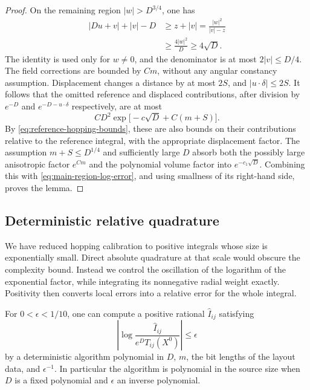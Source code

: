 \begin{proof}
On the remaining region $|w|>D^{3/4}$, one has
\begin{equation}
 \begin{split}
 |Du+v|+|v|-D
   &\ge z+|v|
    =\frac{|w|^2}{|v|-z}\\
   &\ge\frac{4|w|^2}{D}
    \ge4\sqrt D.
 \end{split}
 \label{eq:transverse-excess}
\end{equation}
The identity is used only for $w\ne0$, and the denominator is
at most $2|v|\le D/4$.  The field corrections are bounded by
$Cm$, without any angular constancy assumption.  Displacement
changes a distance by at most $2S$, and $|u\cdot\delta|\le2S$.
It follows that the omitted reference and displaced contributions,
after division by $e^{-D}$ and $e^{-D-u\cdot\delta}$ respectively,
are at most
\begin{equation}
 C D^2\exp\bigl[-c\sqrt D+C(m+S)\bigr].
 \label{eq:transverse-integral-error}
\end{equation}
By \eqref{eq:reference-hopping-bounds}, these are also bounds on
their contributions relative to the reference integral, with
the appropriate displacement factor.  The assumption
$m+S\le D^{1/4}$ and sufficiently large $D$ absorb both the
possibly large anisotropic factor $e^{Cm}$ and the polynomial
volume factor into $e^{-c_1\sqrt D}$.  Combining this with
\eqref{eq:main-region-log-error}, and using smallness of its
right-hand side, proves the lemma.
\end{proof}

\subsection{Deterministic relative quadrature}

We have reduced hopping calibration to positive integrals whose size is
exponentially small. Direct absolute quadrature at that scale would
obscure the complexity bound. Instead we control the oscillation of the
logarithm of the exponential factor, while integrating its nonnegative
radial weight exactly. Positivity then converts local errors into a
relative error for the whole integral.

\begin{lemma}
\label{lem:hopping-quadrature}
For $0<\epsilon<1/10$, one can compute a positive rational
$\widehat I_{ij}$ satisfying
\begin{equation}
 \left|\log\frac{\widehat I_{ij}}{e^D T_{ij}(X^0)}\right|
   \le\epsilon
 \label{eq:reference-quadrature-accuracy}
\end{equation}
by a deterministic algorithm polynomial in $D$, $m$, the bit
lengths of the layout data, and $\epsilon^{-1}$.  In particular
the algorithm is polynomial in the source size when $D$ is a
fixed polynomial and $\epsilon$ an inverse polynomial.
\end{lemma}

